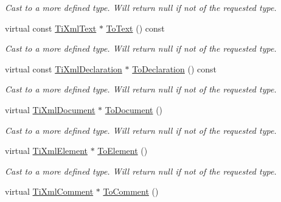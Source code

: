 \begin{DoxyCompactItemize}
\begin{DoxyCompactList}\small\item\em Cast to a more defined type. Will return null if not of the requested type. \end{DoxyCompactList}\item 
virtual const \hyperlink{class_ti_xml_text}{Ti\+Xml\+Text} $\ast$ \hyperlink{class_ti_xml_node_a95a46a52c525992d6b4ee08beb14cd69}{To\+Text} () const \hypertarget{class_ti_xml_node_a95a46a52c525992d6b4ee08beb14cd69}{}\label{class_ti_xml_node_a95a46a52c525992d6b4ee08beb14cd69}

\begin{DoxyCompactList}\small\item\em Cast to a more defined type. Will return null if not of the requested type. \end{DoxyCompactList}\item 
virtual const \hyperlink{class_ti_xml_declaration}{Ti\+Xml\+Declaration} $\ast$ \hyperlink{class_ti_xml_node_a9f43e6984fc7d4afd6eb32714c6b7b72}{To\+Declaration} () const \hypertarget{class_ti_xml_node_a9f43e6984fc7d4afd6eb32714c6b7b72}{}\label{class_ti_xml_node_a9f43e6984fc7d4afd6eb32714c6b7b72}

\begin{DoxyCompactList}\small\item\em Cast to a more defined type. Will return null if not of the requested type. \end{DoxyCompactList}\item 
virtual \hyperlink{class_ti_xml_document}{Ti\+Xml\+Document} $\ast$ \hyperlink{class_ti_xml_node_a6a4c8ac28ee7a745d059db6691e03bae}{To\+Document} ()\hypertarget{class_ti_xml_node_a6a4c8ac28ee7a745d059db6691e03bae}{}\label{class_ti_xml_node_a6a4c8ac28ee7a745d059db6691e03bae}

\begin{DoxyCompactList}\small\item\em Cast to a more defined type. Will return null if not of the requested type. \end{DoxyCompactList}\item 
virtual \hyperlink{class_ti_xml_element}{Ti\+Xml\+Element} $\ast$ \hyperlink{class_ti_xml_node_aa65d000223187d22a4dcebd7479e9ebc}{To\+Element} ()\hypertarget{class_ti_xml_node_aa65d000223187d22a4dcebd7479e9ebc}{}\label{class_ti_xml_node_aa65d000223187d22a4dcebd7479e9ebc}

\begin{DoxyCompactList}\small\item\em Cast to a more defined type. Will return null if not of the requested type. \end{DoxyCompactList}\item 
virtual \hyperlink{class_ti_xml_comment}{Ti\+Xml\+Comment} $\ast$ \hyperlink{class_ti_xml_node_a383e06a0787f7063953934867990f849}{To\+Comment} ()\hypertarget{class_ti_xml_node_a383e06a0787f7063953934867990f849}{}\label{class_ti_xml_node_a383e06a0787f7063953934867990f849}


\end{DoxyCompactItemize}
